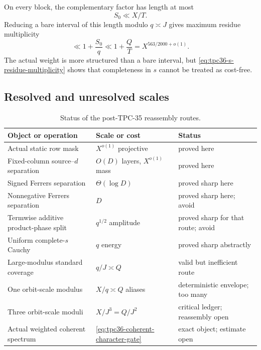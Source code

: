 On every block, the complementary factor has length at most
\begin{equation}
 S_0\ll X/T.
 \label{eq:tpc36-complementary-length}
\end{equation}
Reducing a bare interval of this length modulo \(q\asymp J\) gives maximum
residue multiplicity
\begin{equation}
 \ll1+\frac{S_0}{q}
 \ll1+\frac Q{T}
 =X^{563/2000+o(1)}.
 \label{eq:tpc36-s-residue-multiplicity}
\end{equation}
The actual weight is more structured than a bare interval, but
\eqref{eq:tpc36-s-residue-multiplicity} shows that completeness in \(s\)
cannot be treated as cost-free.

\subsection{Resolved and unresolved scales}

\begin{table}[H]
\centering
\caption{Status of the post-TPC-35 reassembly routes.}
\label{tab:tpc36-status-ledger}
\begin{tabular}{@{}
 >{\raggedright\arraybackslash}p{}
 >{\raggedright\arraybackslash}p{}
 >{\raggedright\arraybackslash}p{}@{}}
\toprule
Object or operation & Scale or cost & Status \\
\midrule
Actual static row mask
 & \(X^{o(1)}\) projective
 & proved here \\
Fixed-column source--\(d\) separation
 & \(O(D)\) layers, \(X^{o(1)}\) mass
 & proved here \\
Signed Ferrers separation
 & \(\Theta(\log D)\)
 & proved sharp here \\
Nonnegative Ferrers separation
 & \(D\)
 & proved sharp here; avoid \\
Termwise additive product-phase split
 & \(q^{1/2}\) amplitude
 & proved sharp for that route; avoid \\
Uniform complete-\(s\) Cauchy
 & \(q\) energy
 & proved sharp abstractly \\
Large-modulus standard coverage
 & \(q/J\asymp Q\)
 & valid but inefficient route \\
One orbit-scale modulus
 & \(X/q\asymp Q\) aliases
 & deterministic envelope; too many \\
Three orbit-scale moduli
 & \(X/J^3=Q/J^2\)
 & critical ledger; reassembly open \\
Actual weighted coherent spectrum
 & \eqref{eq:tpc36-coherent-character-gate}
 & exact object; estimate open \\
\bottomrule
\end{tabular}
\end{table}


